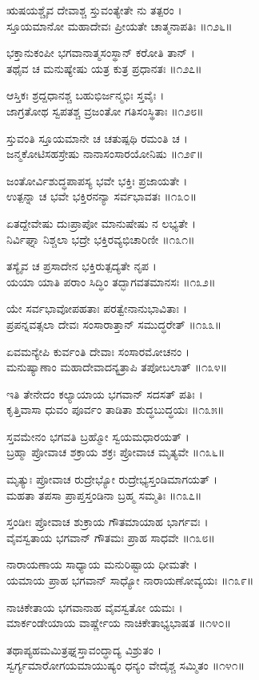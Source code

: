 ಋಷಯಶ್ಚೈವ ದೇವಾಶ್ಚ ಸ್ತುವಂತ್ಯೇತೇ ನು ತತ್ಪರಂ ।\\
ಸ್ತೂಯಮಾನೋ ಮಹಾದೇವಃ ಪ್ರೀಯತೇ ಚಾತ್ಮನಾಪತಿಃ ॥೧೨೬॥

ಭಕ್ತಾನುಕಂಪೀ ಭಗವಾನಾತ್ಮಸಂಸ್ಥಾನ್ ಕರೋತಿ ತಾನ್ ।\\
ತಥೈವ ಚ ಮನುಷ್ಯೇಷು ಯತ್ರ ಕುತ್ರ ಪ್ರಧಾನತಃ ॥೧೨೭॥

ಆಸ್ತಿಕಃ ಶ್ರದ್ದಧಾನಶ್ಚ ಬಹುಭಿರ್ಜನ್ಮಭಿಃ ಸ್ತವೈಃ ।\\
ಜಾಗ್ರತೋಥ ಸ್ವಪತಶ್ಚ ವ್ರಜಂತೋ ಗತಿಸಂಸ್ಥಿತಾಃ ॥೧೨೮॥

ಸ್ತುವಂತಿ ಸ್ತೂಯಮಾನೇ ಚ ಚತುಷ್ಪಥಿ ರಮಂತಿ ಚ ।\\
ಜನ್ಮಕೋಟಿಸಹಸ್ರೇಷು ನಾನಾಸಂಸಾರಯೋನಿಷು ॥೧೨೯॥

ಜಂತೋರ್ವಿಶುದ್ಧಪಾಪಸ್ಯ ಭವೇ ಭಕ್ತಿಃ ಪ್ರಜಾಯತೇ ।\\
ಉತ್ಪನ್ನಾ ಚ ಭವೇ ಭಕ್ತಿರನನ್ಯಾ ಸರ್ವಭಾವತಃ ॥೧೩೦॥

ಏತದ್ದೇವೇಷು ದುಃಪ್ರಾಪೋ ಮಾನುಷೇಷು ನ ಲಭ್ಯತೇ ।\\
ನಿರ್ವಿಘ್ನಾ ನಿಶ್ಚಲಾ ಭದ್ರೇ ಭಕ್ತಿರವ್ಯಭಿಚಾರಿಣೀ ॥೧೩೧॥

ತಸ್ಯೈವ ಚ ಪ್ರಸಾದೇನ ಭಕ್ತಿರುತ್ಪದ್ಯತೇ ನೃಪ ।\\
ಯಯಾ ಯಾತಿ ಪರಾಂ ಸಿದ್ಧಿಂ ತದ್ಭಾಗವತಮಾನಸಃ ॥೧೩೨॥

ಯೇ ಸರ್ವಭಾವೋಪಹತಾಃ ಪರತ್ವೇನಾನುಭಾವಿತಾಃ ।\\
ಪ್ರಪನ್ನವತ್ಸಲಾ ದೇವಃ ಸಂಸಾರಾತ್ತಾನ್ ಸಮುದ್ಧರೇತ್ ॥೧೩೩॥

ಏವಮನ್ಯೇಪಿ ಕುರ್ವಂತಿ ದೇವಾಃ ಸಂಸಾರಮೋಚನಂ ।\\
ಮನುಷ್ಯಾಣಾಂ ಮಹಾದೇವಾದನ್ಯತ್ರಾಪಿ ತಪೋಬಲಾತ್ ॥೧೩೪॥

ಇತಿ ತೇನೇದಂ ಕಲ್ಯಾಯಾಯ ಭಗವಾನ್ ಸದಸತ್ ಪತಿಃ ।\\
ಕೃತ್ತಿವಾಸಾ ಧುವಂ ಪೂರ್ವಂ ತಾಡಿತಾ ಶುದ್ಧಬುದ್ಧಯಃ ॥೧೩೫॥

ಸ್ತವಮೇನಂ ಭಗವತಿ ಬ್ರಹ್ಮೋ ಸ್ವಯಮಧಾರಯತ್ ।\\
ಬ್ರಹ್ಮಾ ಪ್ರೋವಾಚ ಶಕ್ರಾಯ ಶಕ್ರಃ ಪ್ರೋವಾಚ ಮೃತ್ಯವೇ ॥೧೩೬॥

ಮೃತ್ಯುಃ ಪ್ರೋವಾಚ ರುದ್ರೇಭ್ಯೋ ರುದ್ರೇಭ್ಯಸ್ತಂಡಿಮಾಗಯತ್ ।\\
ಮಹತಾ ತಪಸಾ ಪ್ರಾಪ್ತಸ್ತಂಡಿನಾ ಬ್ರಹ್ಮ ಸಮ್ಮತಿಃ ॥೧೩೭॥

ಸ್ತಂಡೀಃ ಪ್ರೋವಾಚ ಶುಕ್ರಾಯ ಗೌತಮಾಯಾಹ ಭಾರ್ಗವಃ ।\\
ವೈವಸ್ವತಾಯ ಭಗವಾನ್ ಗೌತಮಃ ಪ್ರಾಹ ಸಾಧವೇ ॥೧೩೮॥

ನಾರಾಯಣಾಯ ಸಾಧ್ಯಾಯ ಮನುರಿಷ್ಟಾಯ ಧೀಮತೇ ।\\
ಯಮಾಯ ಪ್ರಾಹ ಭಗವಾನ್ ಸಾಧ್ಯೋ ನಾರಾಯಣೋವ್ಯಯಃ ॥೧೩೯॥

ನಾಚಿಕೇತಾಯ ಭಗವಾನಾಹ ವೈವಸ್ವತೋ ಯಮಃ ।\\
ಮಾರ್ಕಂಡೇಯಾಯ ವಾರ್ಷ್ಣೇಯ ನಾಚಿಕೇತಾಭ್ಯಭಾಷತ ॥೧೪೦॥

ತಥಾಪ್ಯಹಮಮಿತ್ರಘ್ನಸ್ತಾವಂದ್ಧಾದ್ಯ ವಿಶ್ರುತಂ ।\\
ಸ್ವರ್ಗ್ಯಮಾರೋಗಯಮಾಯುಷ್ಯಂ ಧನ್ಯಂ ವೇದೈಶ್ಚ ಸಮ್ಮಿತಂ ॥೧೪೧॥

